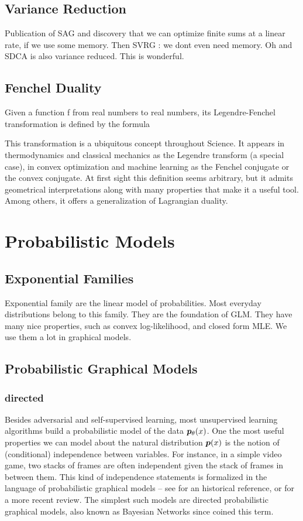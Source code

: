 \subsection{Variance Reduction}
\label{ssec:variance-reduction}
Publication of SAG and discovery that we can optimize finite sums at a linear rate, if we use some memory. Then SVRG : we dont even need memory. Oh and SDCA is also variance reduced. This is wonderful.

\subsection{Fenchel Duality}
\label{ssec:fenchel-duality}
Given a function f from real numbers to real numbers, its Legendre-Fenchel transformation is defined by the formula
 
This transformation is a ubiquitous concept throughout Science. It appears in thermodynamics and classical mechanics as the Legendre transform (a special case), in convex optimization and machine learning as the Fenchel conjugate or the convex conjugate. At first sight this definition seems arbitrary, but it admits geometrical interpretations along with many properties that make it a useful tool. Among others, it offers a generalization of Lagrangian duality.

\section{Probabilistic Models}
\subsection{Exponential Families}
\label{ssec:exponential-families}
Exponential family are the linear model of probabilities. 
Most everyday distributions belong to this family.
They are the foundation of GLM.
They have many nice properties, such as convex log-likelihood, and closed form MLE.
We use them a lot in graphical models. 

\subsection{Probabilistic Graphical Models}
\label{ssec:PGM}
\subsubsection{directed} 
Besides adversarial and self-supervised learning, most unsupervised learning algorithms build a probabilistic model of the data $\bm{p}_{\theta}(x)$.
One the most useful properties we can model about the natural distribution $\bm{p}(x)$ is the notion of (conditional) independence between variables. For instance, in a simple video game, two stacks of frames are often independent given the stack of frames in between them. This kind of independence statements is formalized in the language of probabilistic graphical models -- see \citet{pearl1988probabilistic} for an historical reference, or  \citet{koller2009probabilistic} for a more recent review. The simplest such models are directed probabilistic graphical models, also known as Bayesian Networks since \citet{pearl1985bayesian} coined this term.

